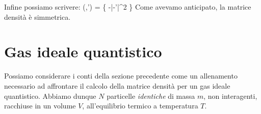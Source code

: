 Infine possiamo scrivere:
\be
\rho(,') = \exp\left\{
-|-'|^2
\right\}
\ee
Come avevamo anticipato, la matrice densità è simmetrica.

\section{Gas ideale quantistico}

Possiamo considerare i conti della sezione precedente come un allenamento necessario ad affrontare il calcolo della matrice densità per un gas ideale quantistico. Abbiamo dunque $N$ particelle {\em identiche} di massa $m$, non interagenti, racchiuse in un volume $V$, all'equilibrio termico a temperatura $T$.

